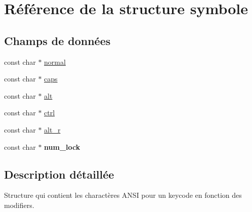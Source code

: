 \hypertarget{structsymbole}{\section{Référence de la structure symbole}
\label{structsymbole}
}
\subsection*{Champs de données}
\begin{DoxyCompactItemize}
\item 
const char $\ast$ \hyperlink{structsymbole_a325f3bf3c7b29dbc931ec1a61df19bea}{normal}
\item 
const char $\ast$ \hyperlink{structsymbole_a817ffc97047283180645063db79a621d}{caps}
\item 
const char $\ast$ \hyperlink{structsymbole_a35f794a092160ffe7926bbf11c670298}{alt}
\item 
const char $\ast$ \hyperlink{structsymbole_a2383cac8f05d012336683f0af44535b5}{ctrl}
\item 
const char $\ast$ \hyperlink{structsymbole_abd9f93b644b1d63156ff92f3f1a65649}{alt\+\_\+r}
\item 
\hypertarget{structsymbole_ad065a9b3f1f06815e4cfc07aabcd0933}{const char $\ast$ {\bfseries num\+\_\+lock}}\label{structsymbole_ad065a9b3f1f06815e4cfc07aabcd0933}

\end{DoxyCompactItemize}


\subsection{Description détaillée}
Structure qui contient les charactères A\+N\+S\+I pour un keycode en fonction des modifiers. 

